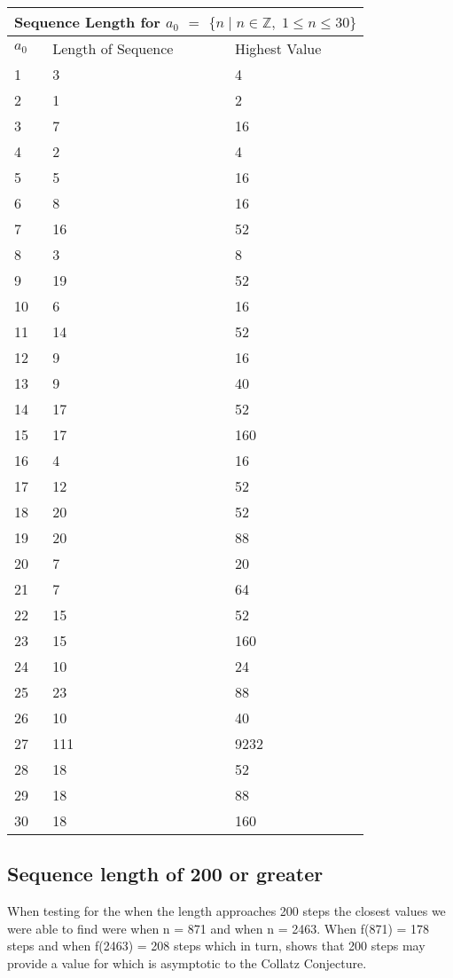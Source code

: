 \documentclass[10pt,english, openany]{book}
\begin{document}
 \vspace{1cm}
  \setlength{\arrayrulewidth}{1mm}
{
\begin{tabular}{ |p{3cm}|p{3cm}|p{3cm}|  }
\hline
\multicolumn{3}{|c|}{Sequence Length for $a_0$ $=$ $\{n \mid n \in \mathbb{Z},\; 1 \leq n \leq 30\}$} \\
\hline
$a_0$& Length of Sequence&Highest Value\\
\hline
 1&  3  & 4\\
 2&  1  & 2\\
 3&  7  & 16\\
 4&  2  & 4 \\
 5&  5  & 16\\
 6&  8  & 16\\
 7&  16  & 52\\
 8&  3  & 8 \\
 9&  19  & 52\\
 10& 6  & 16\\
 11&  14  & 52\\
 12&  9  & 16\\
 13&  9  & 40\\
 14&  17  & 52\\
 15&  17  & 160\\
 16&  4  & 16 \\
 17&  12  & 52\\
 18&  20  & 52\\
 19&  20  & 88\\
 20&  7  & 20\\
 21&  7  & 64 \\
 22&  15  & 52\\
 23&  15  & 160\\
 24&  10  & 24\\
 25&  23  & 88\\
 26&  10  & 40\\
 27&  111  & 9232\\
 28&  18  & 52\\
 29&  18  & 88\\
 30&  18 & 160\\
\hline
\end{tabular}
}

\subsection{Sequence length of 200 or greater}
When testing for the when the length approaches 200 steps the closest values we were able to find were when n = 871 and when n = 2463. When f(871) = 178 steps and when f(2463) = 208 steps which in turn,  shows that 200 steps may provide a value for which is asymptotic to the Collatz Conjecture.    
\end{document}
